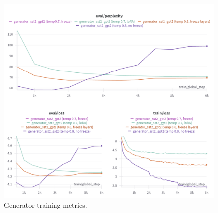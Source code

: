 \documentclass[11pt]{article}
\begin{document}
\begin{figure}[htbp]
  \centering
  \includegraphics[width=\linewidth]{figures/generator_training_metrics.png}
  \endminipage\hfill
  \caption{Generator training metrics.}
  \label{fig:gen-metrics-training}
\end{figure}
\end{document}
